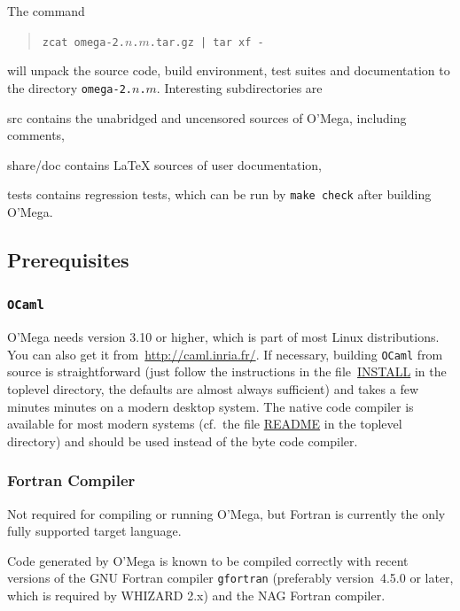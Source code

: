 \documentclass[12pt,a4paper]{article}
\newenvironment{files}%
 {\begin{list}{}%
   {\setlength{\leftmargin}{3em}%
    \setlength{\rightmargin}{3em}%
    \setlength{\itemindent}{1em}%
    \setlength{\listparindent}{0pt}%
    \settowidth{\labelwidth}{5em}%
    \renewcommand{\makelabel}[1]{\texttt{##1}}}}%
 {\end{list}}
\def\OCaml/{\texttt{OCaml}}
\begin{document}
The command
\begin{quote}
    \verb+zcat omega-2.+$n$\verb+.+$m$\verb+.tar.gz | tar xf -+
\end{quote}
will unpack the source code, build environment, test suites and
documentation to the directory \texttt{omega-2.}$n$\texttt{.}$m$.  Interesting
subdirectories are
\begin{files}
  \item[src] contains the unabridged and uncensored sources of O'Mega,
    including comments,
  \item[share/doc] contains \LaTeX{} sources of user documentation,
  \item[tests] contains regression tests, which can be run by
    \texttt{make check} after building O'Mega.
\end{files}

\subsection{Prerequisites}
\subsubsection{\OCaml/}
O'Mega needs version 3.10 or higher, which is part of most Linux
distributions.  You can also get it from~\url{http://caml.inria.fr/}.
If necessary, building \OCaml/ from source is straightforward (just
follow the instructions in the file~\url{INSTALL} in the toplevel
directory, the defaults are almost always sufficient) and takes a few
minutes minutes on a modern desktop system.  The native code compiler
is available for most modern systems (cf.~the file \url{README} in the
toplevel directory) and should be used instead of the byte code compiler.

\subsubsection{Fortran Compiler}
Not required for compiling or running O'Mega, but Fortran is
currently the only fully supported target language.

Code generated by O'Mega is known to be compiled correctly with recent
versions of the GNU Fortran compiler \texttt{gfortran} (preferably
version~4.5.0 or later, which is required by WHIZARD 2.x) and the NAG
Fortran compiler.
\end{document}

